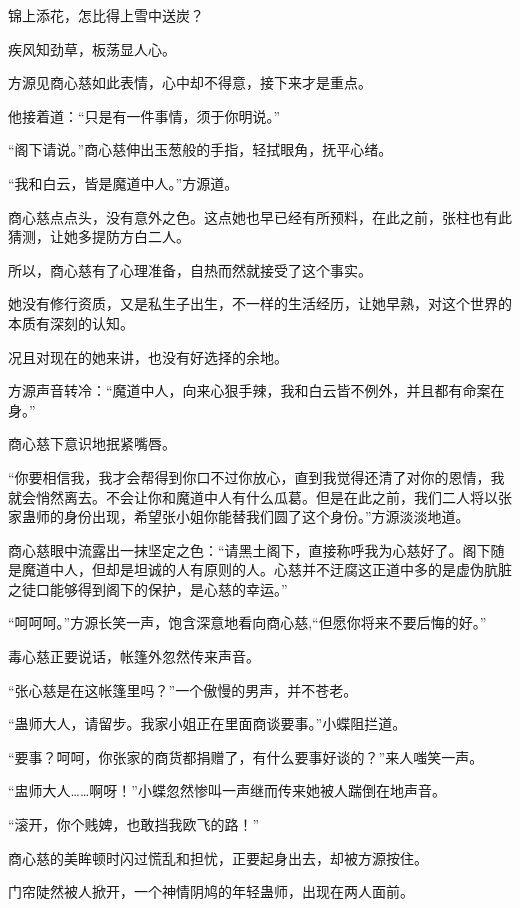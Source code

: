 
\begin{this_body}

锦上添花，怎比得上雪中送炭？

疾风知劲草，板荡显人心。

方源见商心慈如此表情，心中却不得意，接下来才是重点。

他接着道：“只是有一件事情，须于你明说。”

“阁下请说。”商心慈伸出玉葱般的手指，轻拭眼角，抚平心绪。

“我和白云，皆是魔道中人。”方源道。

商心慈点点头，没有意外之色。这点她也早已经有所预料，在此之前，张柱也有此猜测，让她多提防方白二人。

所以，商心慈有了心理准备，自热而然就接受了这个事实。

她没有修行资质，又是私生子出生，不一样的生活经历，让她早熟，对这个世界的本质有深刻的认知。

况且对现在的她来讲，也没有好选择的余地。

方源声音转冷：“魔道中人，向来心狠手辣，我和白云皆不例外，并且都有命案在身。”

商心慈下意识地抿紧嘴唇。

“你要相信我，我才会帮得到你口不过你放心，直到我觉得还清了对你的恩情，我就会悄然离去。不会让你和魔道中人有什么瓜葛。但是在此之前，我们二人将以张家蛊师的身份出现，希望张小姐你能替我们圆了这个身份。”方源淡淡地道。

商心慈眼中流露出一抹坚定之色：“请黑土阁下，直接称呼我为心慈好了。阁下随是魔道中人，但却是坦诚的人有原则的人。心慈并不迂腐这正道中多的是虚伪肮脏之徒口能够得到阁下的保护，是心慈的幸运。”

“呵呵呵。”方源长笑一声，饱含深意地看向商心慈,“但愿你将来不要后悔的好。”

毒心慈正要说话，帐篷外忽然传来声音。

“张心慈是在这帐篷里吗？”一个傲慢的男声，并不苍老。

“蛊师大人，请留步。我家小姐正在里面商谈要事。”小蝶阻拦道。

“要事？呵呵，你张家的商货都捐赠了，有什么要事好谈的？”来人嗤笑一声。

“盅师大人……啊呀！”小蝶忽然惨叫一声继而传来她被人踹倒在地声音。

“滚开，你个贱婢，也敢挡我欧飞的路！”

商心慈的美眸顿时闪过慌乱和担忧，正要起身出去，却被方源按住。

门帘陡然被人掀开，一个神情阴鸠的年轻蛊师，出现在两人面前。


\end{this_body}
